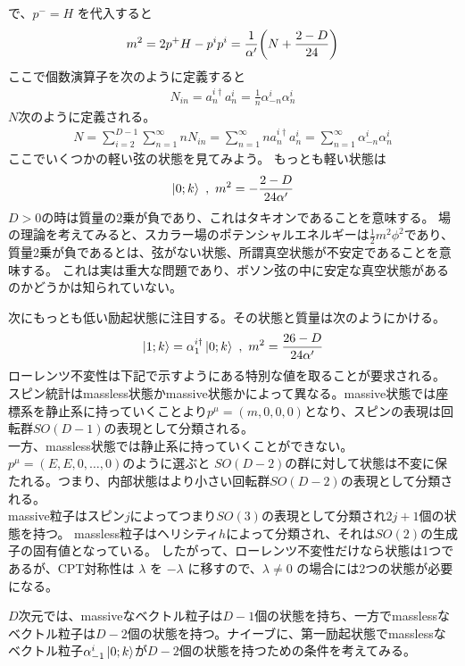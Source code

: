 \documentclass[11pt, dvipdfmx]{article}
\numberwithin{equation}{section}
\newcommand{\blankline}{\par\vspace{\baselineskip}} %
\begin{document}
で、$p^- = H$ を代入すると
\begin{align}
    m^2=2p^+H - p^ip^i=\frac{1}{\alpha'}\qty(N+\frac{2-D}{24})\label{light cone mass shell}
\end{align}
ここで個数演算子を次のように定義すると
\begin{align}
    N_{in} = a^{i\dagger}_n a^i_n = \frac{1}{n}\alpha^i_{-n}\alpha^i_n
\end{align}
$N$次のように定義される。
\begin{align}
    N = \sum_{i=2}^{D-1}\sum_{n=1}^{\infty} nN_{in} = \sum_{n=1}^{\infty}n a^{i\dagger}_n a^i_n = \sum_{n=1}^{\infty} \alpha^i_{-n}\alpha^i_n
\end{align}
ここでいくつかの軽い弦の状態を見てみよう。
もっとも軽い状態は
\begin{align}
    \ket{0;k}\ , \ m^2 = -\frac{2-D}{24\alpha'}
\end{align}
$D>0$の時は質量の2乗が負であり、これはタキオンであることを意味する。
場の理論を考えてみると、スカラー場のポテンシャルエネルギーは$\frac{1}{2}m^2\phi^2$であり、
質量2乗が負であるとは、弦がない状態、所謂真空状態が不安定であることを意味する。
これは実は重大な問題であり、ボソン弦の中に安定な真空状態があるのかどうかは知られていない。
\blankline
次にもっとも低い励起状態に注目する。その状態と質量は次のようにかける。
\begin{align}
    \ket{1;k} = \alpha^{i\dagger}_1 \ket{0;k}\ , \ m^2 =  \frac{26-D}{24\alpha'}\label{light cone massless}
\end{align}
ローレンツ不変性は下記で示すようにある特別な値を取ることが要求される。
スピン統計はmassless状態かmassive状態かによって異なる。massive状態では座標系を静止系に持っていくことより$p^\mu=(m,0,0,0)$となり、スピンの表現は回転群$SO(D-1)$の表現として分類される。\\
一方、massless状態では静止系に持っていくことができない。$p^\mu=(E,E,0,\dots,0)$のように選ぶと
$SO(D-2)$の群に対して状態は不変に保たれる。つまり、内部状態はより小さい回転群$SO(D-2)$の表現として分類される。\\
massive粒子はスピン$j$によってつまり$SO(3)$の表現として分類され$2j+1$個の状態を持つ。
massless粒子はヘリシティ$h$によって分類され、それは$SO(2)$の生成子の固有値となっている。
したがって、ローレンツ不変性だけなら状態は1つであるが、CPT対称性は $\lambda$ を $-\lambda$ に移すので、$\lambda \neq 0$ の場合には2つの状態が必要になる。
\blankline
$D$次元では、massiveなベクトル粒子は$D-1$個の状態を持ち、一方でmasslessなベクトル粒子は$D-2$個の状態を持つ。ナイーブに、第一励起状態でmasslessなベクトル粒子$\alpha_{-1}^i \ket{0;k}$が$D-2$個の状態を持つための条件を考えてみる。
\end{document}
